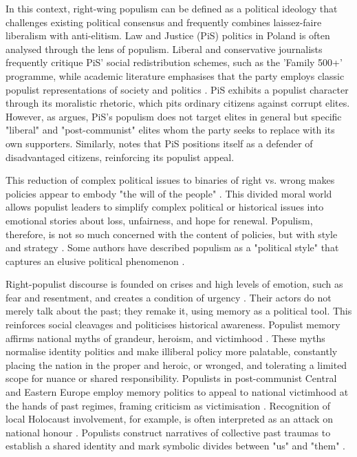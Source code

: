 In this context, right-wing populism can be defined as a political ideology that challenges existing political consensus and frequently combines laissez-faire liberalism with anti-elitism. Law and Justice (PiS) politics in Poland is often analysed through the lens of populism. Liberal and conservative journalists frequently critique PiS' social redistribution schemes, such as the 'Family 500+' programme, while academic literature emphasises that the party employs classic populist representations of society and politics \citep{cadier_populism_2020}. PiS exhibits a populist character through its moralistic rhetoric, which pits ordinary citizens against corrupt elites. However, as \citet{bill_counter-elite_2022} argues, PiS's populism does not target elites in general but specific "liberal" and "post-communist" elites whom the party seeks to replace with its own supporters. Similarly, \citet{ost_workers_2018} notes that PiS positions itself as a defender of disadvantaged citizens, reinforcing its populist appeal.

This reduction of complex political issues to binaries of right vs. wrong makes policies appear to embody "the will of the people" \citep{couperus_memory_2023}. This divided moral world allows populist leaders to simplify complex political or historical issues into emotional stories about loss, unfairness, and hope for renewal. Populism, therefore, is not so much concerned with the content of policies, but with style and strategy \citep{forchtner_trajectory_2019}. Some authors have described populism as a "political style" that captures an elusive political phenomenon \citep{moffitt_global_2016}.

Right-populist discourse is founded on crises and high levels of emotion, such as fear and resentment, and creates a condition of urgency \citep{forchtner_trajectory_2019}. Their actors do not merely talk about the past; they remake it, using memory as a political tool. This reinforces social cleavages and politicises historical awareness. Populist memory affirms national myths of grandeur, heroism, and victimhood \citep{subotic_political_2018}. These myths normalise identity politics and make illiberal policy more palatable, constantly  placing the nation in the proper and heroic, or wronged, and tolerating a limited scope for nuance or shared responsibility. Populists in post-communist Central and Eastern Europe employ memory politics to appeal to national victimhood at the hands of past regimes, framing criticism as victimisation \citep{woycicka_mnemonic_2024}. Recognition of local Holocaust involvement, for example, is often interpreted as an attack on national honour \citep{grabowski_memory_2018}. Populists construct narratives of collective past traumas to establish a shared identity and mark symbolic divides between "us" and "them" \citep{wydra_generations_2018}.

